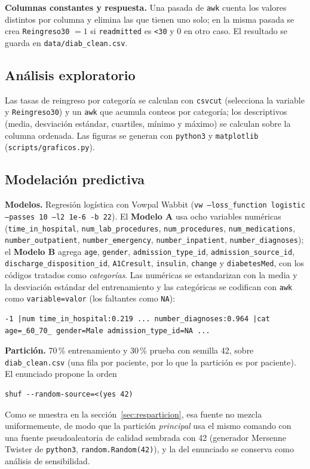\documentclass[11pt,a4paper]{article}
\newcommand{\cod}[1]{\texttt{#1}}
\begin{document}
\textbf{Columnas constantes y respuesta.} Una pasada de \cod{awk} cuenta los valores distintos por columna y elimina las que tienen uno solo; en la misma pasada se crea \cod{Reingreso30} $=1$ si \cod{readmitted} es \cod{<30} y $0$ en otro caso. El resultado se guarda en \cod{data/diab\_clean.csv}.

\subsection{Análisis exploratorio}
Las tasas de reingreso por categoría se calculan con \cod{csvcut} (selecciona la variable y \cod{Reingreso30}) y un \cod{awk} que acumula conteos por categoría; los descriptivos (media, desviación estándar, cuartiles, mínimo y máximo) se calculan sobre la columna ordenada. Las figuras se generan con \cod{python3} y \cod{matplotlib} (\cod{scripts/graficos.py}).

\subsection{Modelación predictiva}
\textbf{Modelos.} Regresión logística con Vowpal Wabbit (\cod{vw --loss\_function logistic --passes 10 --l2 1e-6 -b 22}). El \textbf{Modelo A} usa ocho variables numéricas (\cod{time\_in\_hospital}, \cod{num\_lab\_procedures}, \cod{num\_procedures}, \cod{num\_medications}, \cod{number\_outpatient}, \cod{number\_emergency}, \cod{number\_inpatient}, \cod{number\_diagnoses}); el \textbf{Modelo B} agrega \cod{age}, \cod{gender}, \cod{admission\_type\_id}, \cod{admission\_source\_id}, \cod{discharge\_disposition\_id}, \cod{A1Cresult}, \cod{insulin}, \cod{change} y \cod{diabetesMed}, con los códigos tratados como \emph{categorías}. Las numéricas se estandarizan con la media y la desviación estándar del entrenamiento y las categóricas se codifican con \cod{awk} como \cod{variable=valor} (los faltantes como \cod{NA}):
\begin{lstlisting}
-1 |num time_in_hospital:0.219 ... number_diagnoses:0.964 |cat age=_60_70_ gender=Male admission_type_id=NA ...
\end{lstlisting}
\textbf{Partición.} 70\,\% entrenamiento y 30\,\% prueba con semilla 42, sobre \cod{diab\_clean.csv} (una fila por paciente, por lo que la partición es por paciente). El enunciado propone la orden
\begin{lstlisting}
shuf --random-source=<(yes 42)
\end{lstlisting}
Como se muestra en la sección~\ref{sec:resparticion}, esa fuente no mezcla uniformemente, de modo que la partición \emph{principal} usa el mismo comando con una fuente pseudoaleatoria de calidad sembrada con 42 (generador Mersenne Twister de \cod{python3}, \cod{random.Random(42)}), y la del enunciado se conserva como análisis de sensibilidad.
\end{document}
